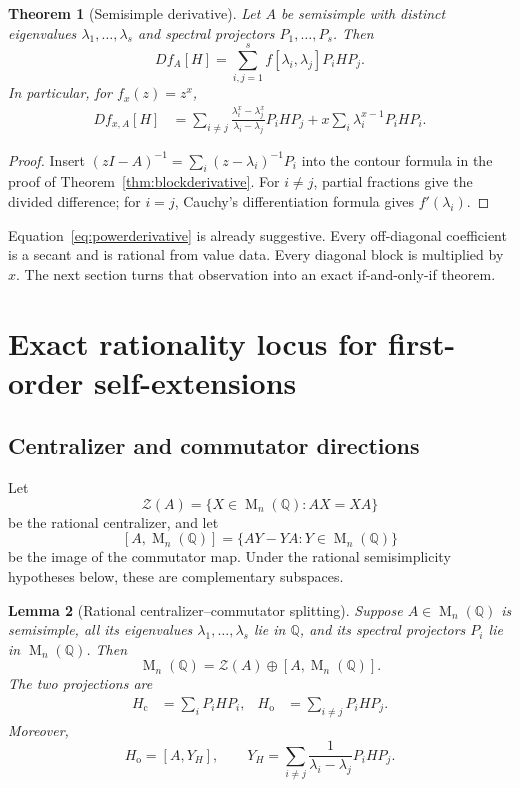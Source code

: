 \documentclass[11pt,oneside]{article}
\newtheorem{theorem}{Theorem}[section]
\newtheorem{lemma}[theorem]{Lemma}
\theoremstyle{definition}
\theoremstyle{remark}
\newcommand{\Q}{\mathbb Q}
\newcommand{\Mat}{\operatorname{M}}
\newcommand{\cZ}{\mathcal Z}
\begin{document}
\begin{theorem}[Semisimple derivative]
\label{thm:semisimplederivative}
Let $A$ be semisimple with distinct eigenvalues $\lambda_1,\dots,\lambda_s$ and spectral
projectors $P_1,\dots,P_s$.  Then
\begin{equation}
 Df_A[H]=\sum_{i,j=1}^s f[\lambda_i,\lambda_j]P_iHP_j.
 \label{eq:divideddifference}
\end{equation}
In particular, for $f_x(z)=z^x$,
\begin{align}
 Df_{x,A}[H]
 &=\sum_{i\ne j}\frac{\lambda_i^x-\lambda_j^x}{\lambda_i-\lambda_j}P_iHP_j
   +x\sum_i\lambda_i^{x-1}P_iHP_i.
 \label{eq:powerderivative}
\end{align}
\end{theorem}

\begin{proof}
Insert $(zI-A)^{-1}=\sum_i(z-\lambda_i)^{-1}P_i$ into the contour formula in the proof of
Theorem~\ref{thm:blockderivative}.  For $i\ne j$, partial fractions give the divided
difference; for $i=j$, Cauchy's differentiation formula gives $f'(\lambda_i)$.
\end{proof}

Equation~\eqref{eq:powerderivative} is already suggestive.  Every off-diagonal coefficient is
a secant and is rational from value data.  Every diagonal block is multiplied by $x$.
The next section turns that observation into an exact if-and-only-if theorem.

\section{Exact rationality locus for first-order self-extensions}
\label{sec:rationalitylocus}

\subsection{Centralizer and commutator directions}

Let
\[
 \cZ(A)=\{X\in\Mat_n(\Q):AX=XA\}
\]
be the rational centralizer, and let
\[
 [A,\Mat_n(\Q)]=\{AY-YA:Y\in\Mat_n(\Q)\}
\]
be the image of the commutator map.  Under the rational semisimplicity hypotheses below, these
are complementary subspaces.

\begin{lemma}[Rational centralizer--commutator splitting]
\label{lem:centralizercommutator}
Suppose $A\in\Mat_n(\Q)$ is semisimple, all its eigenvalues
$\lambda_1,\dots,\lambda_s$ lie in $\Q$, and its spectral projectors $P_i$ lie in
$\Mat_n(\Q)$.  Then
\begin{equation}
 \Mat_n(\Q)=\cZ(A)\oplus[A,\Mat_n(\Q)].
 \label{eq:centralizerdecomp}
\end{equation}
The two projections are
\begin{align}
 H_{\mathrm c}&=\sum_iP_iHP_i,
 &
 H_{\mathrm o}&=\sum_{i\ne j}P_iHP_j.
 \label{eq:centraloff}
\end{align}
Moreover,
\begin{equation}
 H_{\mathrm o}=[A,Y_H],
 \qquad
 Y_H=\sum_{i\ne j}\frac1{\lambda_i-\lambda_j}P_iHP_j.
 \label{eq:YH}
\end{equation}
\end{lemma}
\end{document}
